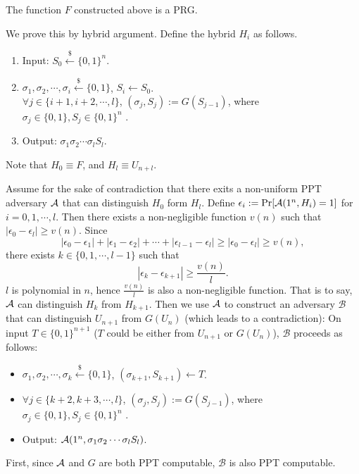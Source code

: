 \documentclass[12pt]{tufte-book}
\begin{document}
\begin{theorem}
The function $F$ constructed above is a PRG.
\end{theorem}

\proof
We prove this by hybrid argument. Define the hybrid $H_i$ as follows.
\begin{enumerate}[label=(\alph*)]
	\item Input: $S_0 \xleftarrow{\$} \{0, 1\}^n$.
    \item $\sigma_1, \sigma_2, \cdots, \sigma_i \xleftarrow{\$} \{0, 1\}$, $S_i \gets S_0$.\\
     $\forall j \in \{i+1, i+2, \cdots, l\}$, $(\sigma_j, S_j) := G(S_{j-1})$, where $\sigma_j \in \{0, 1\}, S_j \in \{0, 1\}^n$ .
    \item Output: $\sigma_1 \sigma_2 \cdots \sigma_l S_l$.
\end{enumerate}
Note that $H_0 \equiv F$, and $H_l \equiv U_{n+l}$.

Assume for the sake of contradiction that there exits a non-uniform PPT adversary $\mathcal{A}$ that can distinguish $H_0$ form $H_l$.
Define $\epsilon_i := \Pr[\mathcal{A}(1^n, H_i)=1]$ for $i = 0, 1, \cdots, l$.
Then there exists a non-negligible function $v(n)$ such that $|\epsilon_0 - \epsilon_l| \geq v(n)$.
Since
\[
|\epsilon_0 - \epsilon_1| +
|\epsilon_1 - \epsilon_2| +
\cdots +
|\epsilon_{l-1} - \epsilon_l| \geq
|\epsilon_0 - \epsilon_l|
\geq v(n),
\]
there exists $k \in \{0, 1, \cdots, l-1\}$ such that
\[
|\epsilon_{k} - \epsilon_{k+1}| \geq \frac{v(n)}{l}.
\]
$l$ is polynomial in $n$, hence $\frac{v(n)}{l}$ is also a non-negligible function.
That is to say, $\mathcal{A}$ can distinguish $H_{k}$ from $H_{k+1}$.
Then we use $\mathcal{A}$ to construct an adversary $\mathcal{B}$ that can distinguish $U_{n+1}$ from $G(U_n)$ (which leads to a contradiction):
On input $T \in \{0, 1\}^{n+1}$ ($T$ could be either from $U_{n+1}$ or $G(U_n)$), $\mathcal{B}$ proceeds as follows:
\begin{itemize}
\item $\sigma_1, \sigma_2, \cdots, \sigma_k \xleftarrow{\$} \{0, 1\}$, $(\sigma_{k+1}, S_{k+1}) \gets T$.
\item $\forall j \in \{k+2, k+3, \cdots, l\}$, $(\sigma_j, S_j) := G(S_{j-1})$, where $\sigma_j \in \{0, 1\}, S_j \in \{0, 1\}^n$ .
\item Output: $\mathcal{A}(1^n, \sigma_1 \sigma_2 \cdots \sigma_l S_l)$.
\end{itemize}

First, since $\mathcal{A}$ and $G$ are both PPT computable, $\mathcal{B}$ is also PPT computable.
\end{document}
